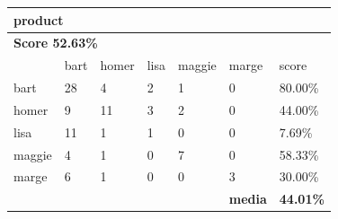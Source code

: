 \documentclass[journal]{IEEEtran}
\begin{document}
\begin{table}[!htb]
\begin{tabular}{l|l|l|l|l|l|l}
\multicolumn{7}{l}{\textbf{product}}                                                        \\ \hline
\multicolumn{7}{l}{\textbf{Score 52.63\%}}                                                  \\ \hline
          & bart      & homer     & lisa      & maggie    & marge          & score            \\ \hline
bart      & 28        & 4         & 2         & 1         & 0              & 80.00\%          \\ \hline
homer     & 9         & 11        & 3         & 2         & 0              & 44.00\%          \\ \hline
lisa      & 11        & 1         & 1         & 0         & 0              & 7.69\%           \\ \hline
maggie    & 4         & 1         & 0         & 7         & 0              & 58.33\%          \\ \hline
marge     & 6         & 1         & 0         & 0         & 3              & 30.00\%          \\ \hline
\textbf{} & \textbf{} & \textbf{} & \textbf{} & \textbf{} & \textbf{media} & \textbf{44.01\%} \\ \hline
\end{tabular}
\end{table}
\end{document}
